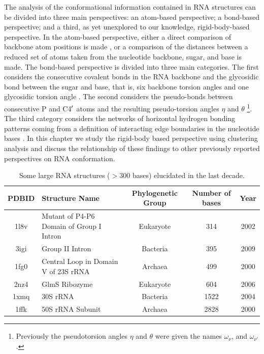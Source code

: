 \noindent The analysis of  the conformational information contained in
RNA  structures  can  be  divided  into three  main  perspectives:  an
atom-based perspective; a bond-based  perspective; and a third, as yet
unexplored  to our  knowledge, rigid-body-based  perspective.   In the
atom-based perspective,  either a  direct comparison of  backbone atom
positions  is  made  \cite{reijmers2001},   or  a  comparison  of  the
distances between  a reduced  set of atoms  taken from  the nucleotide
backbone, sugar,  and base  \cite{sykes2005} is made.   The bond-based
perspective  is  divided  into   three  main  categories.   The  first
considers the consecutive  covalent bonds in the RNA  backbone and the
glycosidic  bond between  the sugar  and base,  that is,  six backbone
torsion  angles and one  glycosidic torsion  angle \cite{reijmers2001,
murray2003,  hershkovitz2003,  schneider2004,  hershkovitz2006}.   The
second   considers  the   pseudo-bonds  between   consecutive   P  and
C4$^{\rm{\prime}}$  atoms  and  the  resulting  pseudo-torsion  angles
$\eta$   and  $\theta$   \cite{olson1_1972,   duarte1998,  duarte2003,
wadley2007} \footnote{Previously  the pseudotorsion angles  $\eta$ and
$\theta$     were    given     the    names     $\omega_{\nu}$,    and
$\omega_{\nu'}$.\cite{olson1980,  malathi1985}}.   The third  category
considers the networks of  horizontal hydrogen bonding patterns coming
from  a definition of  interacting edge  boundaries in  the nucleotide
bases \cite{westhof2000, leontis2002, leontis2006}. In this chapter we
study the  rigid-body based perspective using  clustering analysis and
discuss  the  relationship  of  these  findings  to  other  previously
reported perspectives on RNA conformation.
\begin{table}[htbp]
\begin{center}
{\small
\begin{tabular}{c|p{5cm}|c|c|c}
\hline
\bf{PDBID} & \bf{Structure Name} & \bf{Phylogenetic Group} & \bf{Number of bases} & \bf{Year} \\ \hline
1l8v & Mutant of P4-P6 Domain of Group I Intron & Eukaryote & 314 & 2002 \\ \hline
3igi & Group II Intron & Bacteria & 395 & 2009 \\ \hline
1fg0 & Central Loop in Domain V of 23S rRNA & Archaea & 499 & 2000 \\ \hline
2nz4 & GlmS Ribozyme & Eukaryote & 604 & 2006 \\ \hline
1xmq & 30S rRNA & Bacteria & 1522 & 2004 \\ \hline
1ffk & 50S rRNA Subunit & Archaea & 2828 & 2000 \\ \hline
\end{tabular}
}
\caption{Some large  RNA structures  ($>$300 bases) elucidated  in the
  last decade.}
\end{center}
\label{tab:rnarange}
\end{table}


